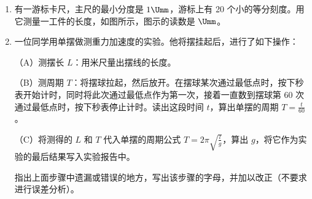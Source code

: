 \documentclass[\gkver]{gaokaozhenti}
\begin{document}
\begin{enumerate}


\item
有一游标卡尺，主尺的最小分度是 $1\Umm$，游标上有 20 个小的等分刻度。用它测量一工件的长度，如图所示，图示的读数是 $\Umm$。



\item
一位同学用单摆做测重力加速度的实验。他将摆挂起后，进行了如下操作：

（A）测摆长 $L$：用米尺量出摆线的长度。

（B）测周期 $T$：将摆球拉起，然后放开。在摆球某次通过最低点时，按下秒表开始计时，同时将此次通过最低点作为第一次，接着一直数到摆球第 60 次通过最低点时，按下秒表停止计时。读出这段时间 $t$，算出单摆的周期 $T=\frac{t}{60}$。

（C）将测得的 $L$ 和 $T$ 代入单摆的周期公式 $T=2\pi\sqrt{\frac{l}{g}}$，算出 $g$，将它作为实验的最后结果写入实验报告中。

指出上面步骤中遗漏或错误的地方，写出该步骤的字母，并加以改正（不要求进行误差分析）。



\end{enumerate}
\end{document}
